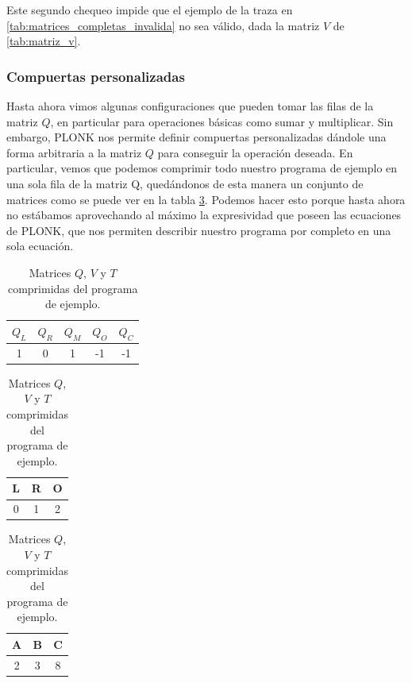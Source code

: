 Este segundo chequeo impide que el ejemplo de la traza en \ref{tab:matrices_completas_invalida} no sea válido, dada la matriz $V$ de \ref{tab:matriz_v}.


\vspace{1em}


\subsubsection{\textbf{Compuertas personalizadas}} \label{sec:plonk_custom_gates}

Hasta ahora vimos algunas configuraciones que pueden tomar las filas de la matriz $Q$, en particular para operaciones básicas como sumar y multiplicar. Sin embargo, PLONK nos permite definir compuertas personalizadas dándole una forma arbitraria a la matriz $Q$ para conseguir la operación deseada. En particular, vemos que podemos comprimir todo nuestro programa de ejemplo en una sola fila de la matriz Q, quedándonos de esta manera un conjunto de matrices como se puede ver en la tabla \ref{tab:matrices_completas_comprimidas}. Podemos hacer esto porque hasta ahora no estábamos aprovechando al máximo la expresividad que poseen las ecuaciones de PLONK, que nos permiten describir nuestro programa por completo en una sola ecuación. 


\begin{table}[h!]
	\centering
	\begin{minipage}{0.3\textwidth}
		\centering
		\begin{tabular}{ccccc}
			\toprule
			\textbf{$Q_L$} & \textbf{$Q_R$} & \textbf{$Q_M$} & \textbf{$Q_O$} & \textbf{$Q_C$} \\
			\midrule
			1 & 0 & 1 & -1 & -1 \\
			\bottomrule
		\end{tabular}
	\end{minipage}
	\hspace{2.5em} %
	\begin{minipage}{0.3\textwidth}
		\centering
		\begin{tabular}{ccc}
			\toprule
			L & R & O \\
			\midrule
			0 & 1 & 2 \\
			\bottomrule
		\end{tabular}
	\end{minipage}
	\hspace{0.01em}
	\begin{minipage}{0.3\textwidth}
		\centering
		\begin{tabular}{ccc}
			\toprule
			A & B & C \\
			\midrule
			2 & 3 & 8 \\
			\bottomrule
		\end{tabular}
	\end{minipage}
	\caption{Matrices $Q$, $V$ y $T$ comprimidas del programa de ejemplo.}
	\label{tab:matrices_completas_comprimidas}
\end{table}



